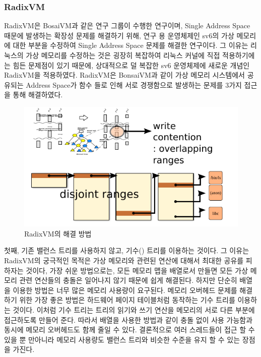 
\subsubsection{RadixVM}

RadixVM은 BosaiVM과 같은 연구 그룹이 수행한 연구이며, 
Single Address Space 때문에 발생하는 확장성 문제를 해결하기 위해, 연구 용 운영체제인 sv6의 가상 메모리에 
대한 부분을 수정하여 Single Address Space 문제를 해결한 연구이다.
그 이유는 리눅스의 가상 메모리를 수정하는 것은 굉장히 복잡하여 리눅스 커널에 직접 적용하기에는 힘든 문제점이 
있기 때문에, 상대적으로 덜 복잡한 sv6 운영체제에 새로운 개념인 RadixVM을 적용하였다. 
RadixVM은 BonsaiVM과 같이 가상 메모리 시스템에서 공유되는 Address Space가  함수 들로 인해 서로 경쟁함으로 발생하는 문제를 3가지 접근을 통해 해결하였다. 

\begin{figure}[h!]
    \centering
    \includegraphics[width=1\textwidth]{fig/radix/radix}
    \caption{RadixVM의 해결 방법}
  \label{fig:radix}
\end{figure}

첫째, 기존 밸런스 트리를 사용하지 않고, 기수() 트리를 이용하는 것이다. 
그 이유는 RadixVM의 궁극적인 목적은 가상 메모리와 관련된 연산에 대해서 최대한 공유를 피하자는 것이다, 
가장 쉬운 방법으로는, 모든 메모리 맵을 배열로서 만들면 모든 가상 메모리 관련 연산들의 충돌은 일어나지 않기 때문에 
쉽게 해결된다.
하지만 단순히 배열을 이용한 방법은 너무 많은 메모리 사용량이 요구된다.
메모리 오버헤드 문제를 해결하기 위한 가장 좋은 방법은 하드웨어 페이지 테이블처럼 동작하는 
기수 트리를 이용하는 것이다.
이처럼 기수 트리는 트리의 읽기와 쓰기 연산을 메모리의 서로 다른 부분에 접근하도록 만들어 준다.
따라서 배열을 사용한 방법과 같이 충돌 없이 사용 가능함과 동시에 메모리 오버헤드도 함께 줄일 수 있다.
결론적으로 여러 스레드들이 접근 할 수 있을 뿐 만아니라 메모리 사용량도 밸런스 트리와 비슷한 
수준을 유지 할 수 있는 장점을 가진다.

